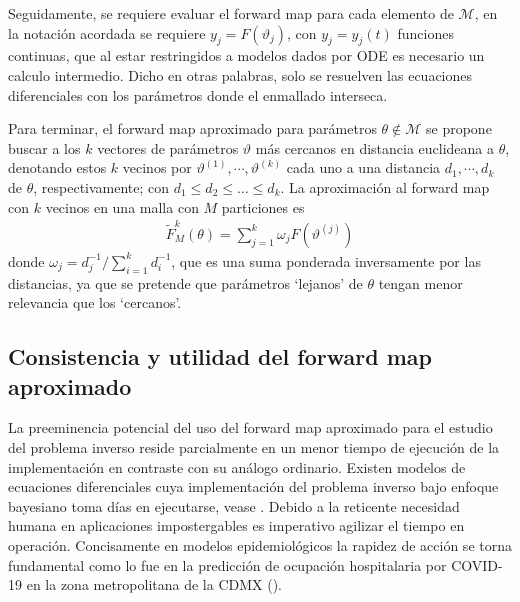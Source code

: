 Seguidamente, se requiere evaluar el forward map para cada elemento de $\mathcal{M}$, en la notación acordada se requiere $y_j = F(\vartheta_j)$, con $y_j = y_j(t)$ funciones continuas, que al estar restringidos a modelos dados por ODE es necesario un calculo intermedio. Dicho en otras palabras, solo se resuelven las ecuaciones diferenciales con los parámetros donde el enmallado interseca.

Para terminar, el forward map aproximado para parámetros $\theta \notin \mathcal{M}$ se propone buscar a los $k$ vectores de parámetros $\vartheta$ más cercanos en distancia euclideana a $\theta$, denotando estos $k$ vecinos por $\vartheta^{(1)}, \cdots, \vartheta^{(k)}$ cada uno a una distancia $d_1, \cdots, d_k$ de $\theta$, respectivamente; con $d_1 \leq d_2 \leq \dots \leq d_k$. La aproximación al forward map con $k$ vecinos en una malla con $M$ particiones es
\begin{align}
    \tilde{F}^{k}_M(\theta) = \sum_{j = 1}^{k} \omega_j F \left(\vartheta^{(j)}\right)
    \label{2.4.01}
\end{align}
donde $\omega_j = d_j^{-1}/ \sum_{i=1}^{k} d_i^{-1}$, que es una suma ponderada inversamente por las distancias, ya que se pretende que parámetros `lejanos' de $\theta$ tengan menor relevancia que los `cercanos'. 


\subsection*{Consistencia y utilidad del forward map aproximado}

La preeminencia potencial del uso del forward map aproximado para el estudio del problema inverso reside parcialmente en un menor tiempo de ejecución de la implementación en contraste con su análogo ordinario. Existen modelos de ecuaciones diferenciales cuya implementación del problema inverso bajo enfoque bayesiano toma días en ejecutarse, vease \cite{Anel}.
Debido a la reticente necesidad humana en aplicaciones impostergables es imperativo agilizar el tiempo en operación. Concisamente en modelos epidemiológicos la rapidez de acción se torna fundamental como lo fue en la predicción de ocupación hospitalaria por COVID-19 en la zona metropolitana de la CDMX (\cite{capistran2020forecasting}).

